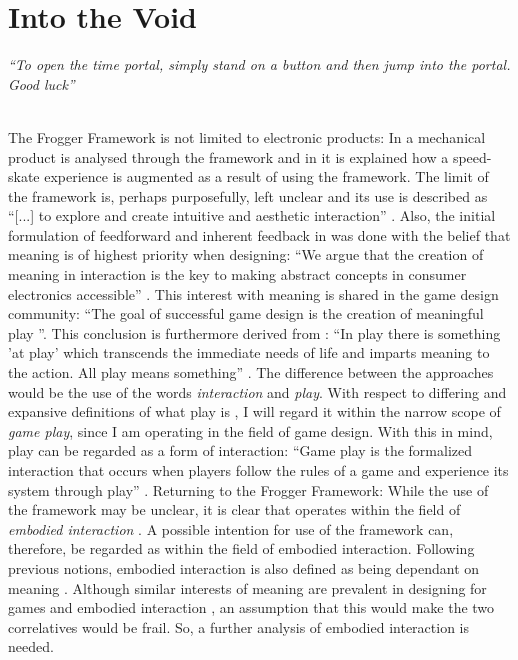 \chapter{Into the Void}
\textit{``To open the time portal, simply stand on a button and then jump into the portal. Good luck''} \\
 \\

The Frogger Framework is not limited to electronic products: In  a mechanical product is analysed through the framework and in  it is explained how a speed-skate experience is augmented as a result of using the framework. The limit of the framework is, perhaps purposefully, left unclear and its use is described as ``[...] to explore and create intuitive and aesthetic interaction'' \cite[p. 22]{transbehav}. Also, the initial formulation of feedforward and inherent feedback in  was done with the belief that meaning is of highest priority when designing: ``We argue that the creation of meaning in interaction is the key to making abstract concepts in consumer electronics accessible'' \cite[p. 2]{howdonald}. This interest with meaning is shared in the game design community: ``The goal of successful game design is the creation of meaningful play ''\cite[ch. 3, p. 3]{salen}. This conclusion is furthermore derived from \cite{huizinga}: ``In play there is something 'at play' which transcends the immediate needs of life and imparts meaning to the action. All play means something'' \cite[p. 1]{huizinga}. The difference between the approaches would be the use of the words \textit{interaction} and \textit{play}. With respect to differing and expansive definitions of what play is \cite{huizinga, sicartplay, salen}, I will regard it within the narrow scope of \textit{game play}, since I am operating in the field of game design. With this in mind, play can be regarded as a form of interaction: ``Game play is the formalized interaction that occurs when players follow the rules of a game and experience its system through play'' \cite[ch. 22, p. 3]{salen}.
Returning to the Frogger Framework: While the use of the framework may be unclear, it is clear that  operates within the field of \textit{embodied interaction} \cite{transbehav}. A possible intention for use of the framework can, therefore, be regarded as within the field of embodied interaction. Following previous notions, embodied interaction is also defined as being dependant on meaning \cite[p. 126]{dourish}. Although similar interests of meaning are prevalent in designing for games \cite{salen} and embodied interaction \cite{dourish}, an assumption that this would make the two correlatives would be frail. So, a further analysis of embodied interaction is needed.

